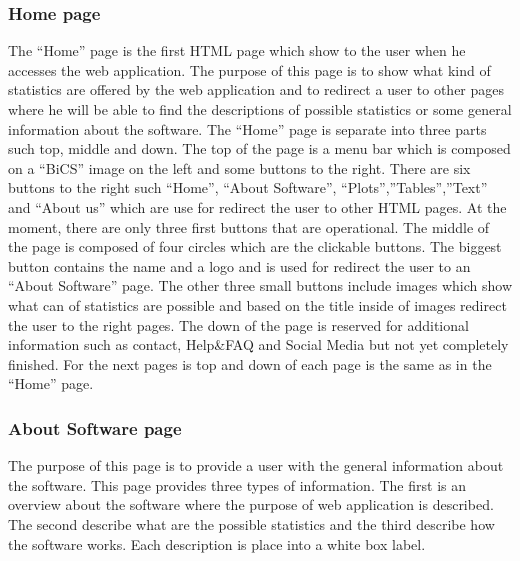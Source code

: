 \documentclass[conference,compsoc]{IEEEtran}
\begin{document}
\subsubsection{Home page}
The “Home” page is the first HTML page which show to the user when he accesses the web application. The purpose of this page is to show what kind of statistics are offered by the web application and to redirect a user to other pages where he will be able to find the descriptions of possible statistics or some general information about the software.
\newline
The “Home” page is separate into three parts such top, middle and down. The top of the page is a menu bar which is composed on a “BiCS” image on the left and some buttons to the right. There are six buttons to the right such “Home”, “About Software”, “Plots”,”Tables”,”Text” and “About us” which are use for redirect the user to other HTML pages. At the moment, there are only three first buttons that are operational. 
\newline                                                                                                                                               
The middle of the page is composed of four circles which are the clickable buttons. The biggest button contains the name and a logo and is used for redirect the user to an “About Software” page. The other three small buttons include images which show what can of statistics are possible and based on the title inside of images redirect the user to the right pages.                                                                   
The down of the page is reserved for additional information such as contact, Help\&FAQ and Social Media but not yet completely finished.
\newline                                                                                    
For the next pages is top and down of each page is the same as in the “Home” page.     

\subsubsection{About Software page}     
The purpose of this page is to provide a user with the general information about the software. This page provides three types of information. The first is an overview about the software where the purpose of web application is described. The second describe what are the possible statistics and the third describe how the software works. Each description is place into a white box label. 
\end{document}
